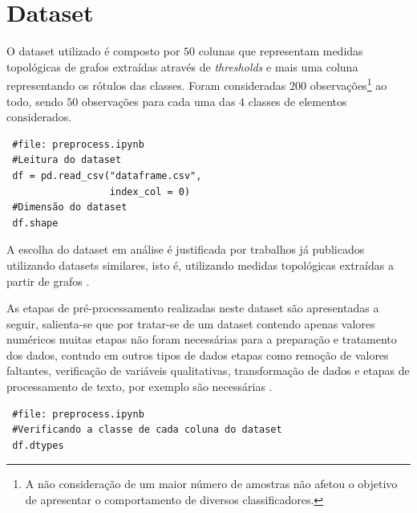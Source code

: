 \documentclass[
	article,			%
	11pt,				%
	oneside,			%
	a4paper,			%
	english,			%
	brazil,				%
	sumario=tradicional
	]{abntex2}
\begin{document}
% 

\textual

\section{Dataset}

O dataset utilizado é composto por $50$ colunas que representam medidas topológicas de grafos extraídas através de \textit{thresholds} e mais uma coluna representando os rótulos das classes. Foram consideradas $200$ observações\footnote{A não consideração de um maior número de amostras não afetou o objetivo de apresentar o comportamento de diversos classificadores.} ao todo, sendo $50$ observações para cada uma das $4$ classes de elementos considerados. 

\begin{verbatim}
 #file: preprocess.ipynb
 #Leitura do dataset
 df = pd.read_csv("dataframe.csv", 
                  index_col = 0)
 #Dimensão do dataset
 df.shape
\end{verbatim}


A escolha do dataset em análise é justificada por trabalhos já publicados utilizando datasets similares, isto é, utilizando medidas topológicas extraídas a partir de grafos \cite{Childs2009, Ito2018}.

As etapas de pré-processamento realizadas neste dataset são apresentadas a seguir, salienta-se que por tratar-se de um dataset contendo apenas valores numéricos  muitas etapas não foram necessárias para a preparação e tratamento dos dados, contudo em outros tipos de dados etapas como remoção de valores faltantes, verificação de variáveis qualitativas, transformação de dados e etapas de processamento de texto, por exemplo são necessárias \cite{garcia2015data}.

\begin{verbatim}
 #file: preprocess.ipynb
 #Verificando a classe de cada coluna do dataset
 df.dtypes
\end{verbatim}
\end{document}
